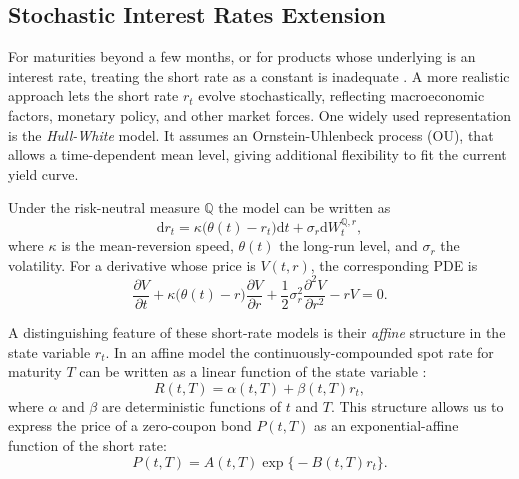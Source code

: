 \documentclass[12pt]{report} %
\theoremstyle{plain} %
\theoremstyle{definition} %
\theoremstyle{remark} %
\begin{document}
\subsection{Stochastic Interest Rates Extension}\label{sec:sr_extension}

For maturities beyond a few months, or for products whose underlying is an interest rate, treating
the short rate as a constant is inadequate \cite{brigo2013interest}. A more realistic approach
lets the short rate \(r_t\) evolve stochastically, reflecting macroeconomic factors, monetary
policy, and other market forces. One widely used representation is the \emph{Hull-White} \cite{hullwhitemodel} model. It assumes an
Ornstein-Uhlenbeck process (OU), that allows a
time-dependent mean level, giving additional flexibility to fit the current yield curve.

Under the risk-neutral measure \(\mathbb{Q}\) the model can be written as
\begin{equation}\label{eq:vasicek_sde}
 \mathrm{d}r_t
 = \kappa\bigl(\theta(t)-r_t\bigr) \mathrm{d}t
 + \sigma_r \mathrm{d}W_t^{\mathbb{Q},r},
\end{equation}
where \(\kappa\) is the mean-reversion speed, \(\theta(t)\) the long-run level, and \(\sigma_r\) the volatility.
For a derivative whose price is \(V(t,r)\), the corresponding PDE is
\begin{equation}\label{eq:vasicek_pde}
 \frac{\partial V}{\partial t}
 + \kappa\bigl(\theta(t)-r\bigr)\frac{\partial V}{\partial r}
 + \frac12\sigma_r^{2}\frac{\partial^{2}V}{\partial r^{2}}
 - rV
 = 0.
\end{equation}

A distinguishing feature of these short-rate models is their \emph{affine} structure in the state
variable \(r_t\). In an affine model the continuously-compounded spot rate for maturity \(T\) can be
written as a linear function of the state variable \cite{brigo2013interest}:
\[
 R(t,T) = \alpha(t,T) + \beta(t,T) r_t,
\]
where \(\alpha\) and \(\beta\) are deterministic functions of \(t\) and \(T\).
This structure allows us to express the price of a zero-coupon bond \(P(t,T)\) as an exponential-affine function of the short rate:
\begin{equation}\label{eq:vasicek_zcb}
 P(t,T) = A(t,T) \exp\bigl\{-B(t,T) r_t\bigr\}.
\end{equation}
\end{document}
